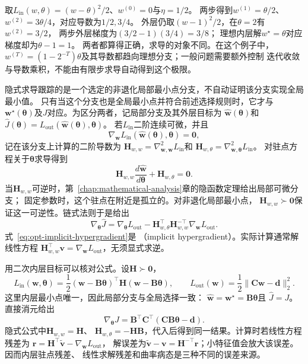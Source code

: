 取$L_{\mathrm{in}}(w,\theta)=(w-\theta)^2/2$、$w^{(0)}=0$与$\eta=1/2$。
两步得到$w^{(1)}=\theta/2$、$w^{(2)}=3\theta/4$，对应导数为$1/2,3/4$。
外层仍取$(w-1)^2/2$，在$\theta=2$有$w^{(2)}=3/2$，
两步外层梯度为$(3/2-1)(3/4)=3/8$；
理想内层解$w^\star=\theta$对应梯度却为$\theta-1=1$。
两者都算得正确，求导的对象不同。在这个例子中，
$w^{(T)}=(1-2^{-T})\theta$及其导数都趋向理想分支；一般问题需要额外控制
迭代收敛与导数乘积，不能由有限步求导自动得到这个极限。

隐式求导跟踪的是一个选定的非退化局部最小点分支，不自动证明该分支实现全局最小值。
只有当这个分支也是全局最小点并符合前述选择规则时，它才与
$\bm{w}^{\star}(\bm{\theta})$及$J$对应。为区分两者，记局部分支及其外层目标为
$\widehat{\bm{w}}(\bm{\theta})$和
$\widehat{J}(\bm{\theta})
=L_{\mathrm{out}}(\widehat{\bm{w}}(\bm{\theta}),\bm{\theta})$。
若$L_{\mathrm{in}}$二阶连续可微，并且
\[
  \nabla_{\bm{w}}L_{\mathrm{in}}
  (\widehat{\bm{w}}(\bm{\theta}),\bm{\theta})=\bm{0},
\]
记在该分支上计算的二阶导数为
$\bm{H}_{w,w}=\nabla_{\bm{w},\bm{w}}^2L_{\mathrm{in}}$和
$\bm{H}_{w,\theta}=\nabla_{\bm{w},\bm{\theta}}^2L_{\mathrm{in}}$。
对驻点方程关于$\bm{\theta}$求导得到
\[
  \bm{H}_{w,w}\frac{d\widehat{\bm{w}}}{d\bm{\theta}}
  +\bm{H}_{w,\theta}=\bm{0}.
\]
当$\bm{H}_{w,w}$可逆时，第~\ref{chap:mathematical-analysis}章的隐函数定理给出局部可微分支；
固定参数时，这个驻点在附近是孤立的。对非退化局部最小点，
$\bm{H}_{w,w}\succ\bm{0}$保证这一可逆性。链式法则于是给出
\begin{equation}
  \nabla_{\bm{\theta}}\widehat{J}
  =
  \nabla_{\bm{\theta}}L_{\mathrm{out}}
  -\bm{H}_{w,\theta}^{\top}
  \bm{H}_{w,w}^{-\top}
  \nabla_{\bm{w}}L_{\mathrm{out}}.
  \label{eq:opt-implicit-hypergradient}
\end{equation}
式~\eqref{eq:opt-implicit-hypergradient}是
（implicit hypergradient）。实际计算通常解线性方程
$\bm{H}_{w,w}^{\top}\bm{v}=\nabla_{\bm{w}}L_{\mathrm{out}}$，无须显式求逆。

用二次内层目标可以核对公式。设$\bm{H}\succ\bm{0}$，
\[
  L_{\mathrm{in}}(\bm{w},\bm{\theta})
  =\frac12(\bm{w}-\bm{B}\bm{\theta})^{\top}
  \bm{H}(\bm{w}-\bm{B}\bm{\theta}),\qquad
  L_{\mathrm{out}}(\bm{w})
  =\frac12\lVert\bm{C}\bm{w}-\bm{d}\rVert_2^2.
\]
这里内层最小点唯一，因此局部分支与全局选择一致：
$\widehat{\bm{w}}=\bm{w}^{\star}=\bm{B}\bm{\theta}$且
$\widehat{J}=J$。直接消元给出
\[
  \nabla_{\bm{\theta}}J
  =\bm{B}^{\top}\bm{C}^{\top}
  (\bm{C}\bm{B}\bm{\theta}-\bm{d}).
\]
隐式公式中$\bm{H}_{w,w}=\bm{H}$、
$\bm{H}_{w,\theta}=-\bm{H}\bm{B}$，代入后得到同一结果。计算时若线性方程残差为
$\bm r=\bm H^\top\widetilde{\bm v}-\nabla_{\bm w}L_{\mathrm{out}}$，
解误差为$\widetilde{\bm v}-\bm v=\bm{H}^{-\top}\bm{r}$；小特征值会放大该误差。因而内层驻点残差、
线性求解残差和曲率病态是三种不同的误差来源。

